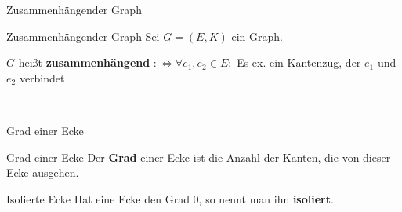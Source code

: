 \begin{frame}{Zusammenhängender Graph}
\begin{block}{Zusammenhängender Graph}
Sei $G = (E, K)$ ein Graph.

$G$ heißt \textbf{zusammenhängend} $:\Leftrightarrow \forall e_1, e_2 \in E: $ 
Es ex. ein Kantenzug, der $e_1$ und $e_2$ verbindet
\end{block}

\begin{gallery}
    \\
\end{gallery}
\end{frame}

\begin{frame}{Grad einer Ecke}
\begin{block}{Grad einer Ecke}
Der \textbf{Grad} einer Ecke ist die Anzahl der Kanten, die von dieser Ecke
ausgehen.
\end{block}

\begin{block}{Isolierte Ecke}
Hat eine Ecke den Grad 0, so nennt man ihn \textbf{isoliert}.
\end{block}

\begin{gallery}
    \\
\end{gallery}
\end{frame}
